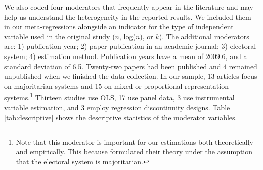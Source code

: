 \documentclass[a4paper,12pt]{article}
\begin{document}
We also coded four moderators that frequently appear in the literature and may
help us understand the heterogeneity in the reported results. We included them
in our meta-regressions alongside an indicator for the type of independent
variable used in the original study ($n$, log($n$), or $k$). The additional
moderators are: 1) publication year; 2) paper publication in an academic
journal; 3) electoral system; 4) estimation method. Publication years have a
mean of 2009.6, and a standard deviation of 6.5. Twenty-two papers had been
published and 4 remained unpublished when we finished the data collection. In
our sample, 13 articles focus on majoritarian systems and 15 on mixed or
proportional representation systems.\footnote{Note that this moderator is
important for our estimations both theoretically and empirically. This because
\citet{weingast1981political} formulated their theory under the assumption that
the electoral system is majoritarian.} Thirteen studies use OLS, 17 use panel
data, 3 use instrumental variable estimation, and 3 employ regression
discontinuity designs. Table \ref{tab:descriptive} shows the descriptive
statistics of the moderator variables.


\vspace{.5cm}
\end{document}

